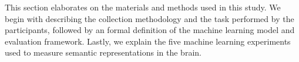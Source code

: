 \label{chapter:methodologies}

This section elaborates on the materials and methods used in this study. We begin with describing the collection methodology and the task performed by the participants, followed by an formal definition of the machine learning model and evaluation framework. Lastly, we explain the five machine learning experiments used to measure semantic representations in the brain.




